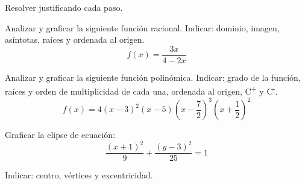 \documentclass[12pt]{exam}
\begin{document}
\begin{questions}
\question Resolver justificando cada paso.

\question Analizar y graficar la siguiente función racional. Indicar: dominio, imagen, asíntotas, raíces y ordenada al origen. 
    \[f(x) = \frac{3x}{4-2x}\]

\question Analizar y graficar la siguiente función polinómica. Indicar: grado de la función, raíces y orden de multiplicidad de cada una, ordenada al origen, C\textsuperscript{+} y C\textsuperscript{-}.
    \[f(x) = 4(x-3)^2 (x-5) \left( x-\frac{7}{2} \right)^3 \left( x+\frac{1}{2} \right)^2\]

\question Graficar la elipse de ecuación:  $$ \dfrac{(x+1)^2}{9} + \dfrac{(y-3)^2}{25} = 1$$ 
    
    Indicar: centro, vértices y excentricidad.

\end{questions}
\end{document}
